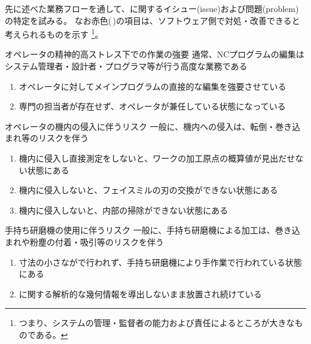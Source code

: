 

先に述べた業務フローを通して、\MMC に関するイシュー(issue)および問題(problem)の特定を試みる。
なお{\color{red}赤色}(\,\sarrow[red]\!)の項目は、ソフトウェア側で対処・改善できると考えられるものを示す
\footnote{つまり、システムの管理・監督者の能力および責任によるところが大きなものである。}。




\begin{Issues}{オペレータの精神的高ストレス下での作業の強要}
通常、NCプログラムの編集はシステム管理者・設計者・プログラマ等が行う高度な業務である
\begin{enumerate}[label=\sarrow]
\item[{\sarrow[red]}]オペレータに対してメインプログラムの直接的な編集を強要させている
\item[{\sarrow[red]}]専門の担当者が存在せず、オペレータが兼任している状態になっている
\end{enumerate}
\end{Issues}

\begin{Issues}{オペレータの機内の侵入に伴うリスク}
一般に、機内への侵入は、転倒・巻き込まれ等のリスクを伴う
\begin{enumerate}[label=\sarrow]
\item[{\sarrow[red]}]機内に侵入し直接測定をしないと、ワークの加工原点の概算値が見出だせない状態にある
\item[{\sarrow[red]}]機内に侵入しないと、フェイスミルの刃の交換ができない状態にある
\item 機内に侵入しないと、内部の掃除ができない状態にある
\end{enumerate}
\end{Issues}

\begin{Issues}{手持ち研磨機の使用に伴うリスク}
一般に、手持ち研磨機による加工は、巻き込まれや粉塵の付着・吸引等のリスクを伴う
\begin{enumerate}[label=\sarrow]
\item[{\sarrow[red]}]寸法の小さな\EndFaceChamferMilling が\MMC で行われず、手持ち研磨機により手作業で行われている状態にある
\item[{\sarrow[red]}]\EndFaceChamferMilling に関する解析的な幾何情報を導出しないまま放置され続けている
\end{enumerate}
\end{Issues}

